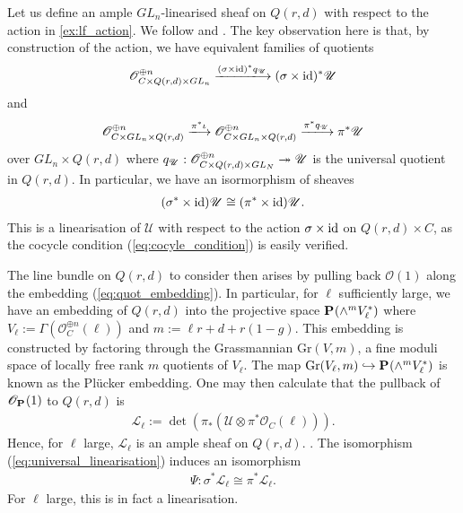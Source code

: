 \documentclass[12pt]{ociamthesis}  %
\begin{document}
\begin{example}
  Let us define an ample $GL_n$-linearised sheaf on
  $Q(r,d)$ with respect to the action in \ref{ex:lf_action}. We follow
  \cite[75-76]{hoskins2016} and \cite[90]{huybrechts2010}.
  The key observation
  here is that, by construction of the action, we have equivalent
  families of quotients
  \begin{align*}
    \mathscr O^{\oplus n}_{C\times Q(r,d)\times GL_n}
    \xlongrightarrow{(\sigma\times\identity)^* q_{\mathscr U}}
    (\sigma\times\identity)^* \mathscr U
  \end{align*}
  and
  \begin{align*}
    \mathscr O^{\oplus n}_{C\times GL_n\times Q(r,d)}
    \xlongrightarrow{\pi^*\iota}
    \mathscr O^{\oplus n}_{C\times GL_n\times Q(r,d)}
    \xlongrightarrow{\pi^*q_{\mathscr U}}
    \pi^*\mathscr U
  \end{align*}
  over $GL_n\times Q(r,d)$ where
  $q_{\mathscr U} : \mathscr O^{\oplus n}_{C\times Q(r,d)\times GL_N} \twoheadrightarrow \mathscr U$
  is the universal quotient in $Q(r,d)$. In particular, we have
  an isormorphism of sheaves
  \begin{align}\label{eq:universal_linearisation}
    (\sigma^*\times\operatorname{id})\mathscr U \cong (\pi^*\times\operatorname{id})\mathscr U.
  \end{align}
  This is a linearisation of $\mathscr U$ with respect to
  the action $\sigma\times\operatorname{id}$ on $Q(r,d)\times C$, as the
  cocycle condition (\ref{eq:cocyle_condition}) is easily verified.

  The line bundle on $Q(r,d)$ to consider then arises
  by pulling back $\mathscr O(1)$ along the embedding (\ref{eq:quot_embedding}).
  In particular, for $\ell$ sufficiently large, we have an
  embedding of $Q(r,d)$ into the projective space
  $\mathbf{P}^{}_{}(\wedge^m V_\ell^*)$
  where $V_\ell:=\Gamma(\mathscr O^{\oplus n}_C(\ell))$ and $m := \ell r+d+r(1-g)$.
  This embedding is constructed by factoring through the Grassmannian
  $\text{Gr}(V,m)$, a fine moduli space of locally free rank $m$ quotients of
  $V_\ell$.  The map $\text{Gr}(V_\ell,m)\hookrightarrow\mathbf{P}^{}_{}(\wedge^m V_\ell^*)$ is known as the Pl\"ucker
  embedding.  One may then calculate that the pullback of $\mathscr
    O_{\mathbf{P}^{}_{}}(1)$ to $Q(r,d)$ is
  \begin{align*}
    \mathscr L_\ell
    := \det(\pi_*(\mathscr U \otimes \pi^*\mathscr O_C(\ell))).
  \end{align*}
  Hence, for $\ell$ large, $\mathscr L_\ell$ is an ample sheaf
  on $Q(r,d)$. \cite[Proposition 2.2.5]{huybrechts2010}.
  The isomorphism (\ref{eq:universal_linearisation}) induces an isomorphism
  \begin{align*}
    \Psi:\sigma^*\mathscr L_\ell \cong \pi^*\mathscr L_\ell.
  \end{align*}
  For $\ell$ large, this is in fact a linearisation.
\end{example}
\end{document}
